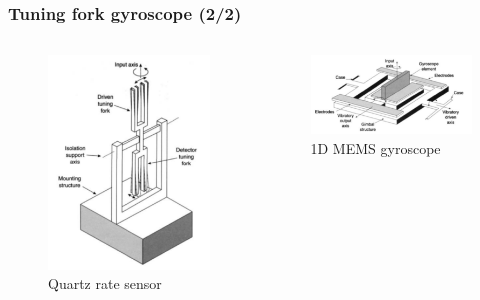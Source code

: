 \documentclass[10pt]{beamer}
\begin{document}
\begin{frame}
\frametitle{Tuning fork gyroscope (2/2)}
\begin{columns}
    \begin{column}{.45\textwidth}
        \begin{figure}
            \centering
            \includegraphics[width=0.9\linewidth]{quartz_rate_gyro.png}
            \caption{Quartz rate sensor\cite{Titterton}}
        \end{figure}
    \end{column}
    \hfill
    \begin{column}{.70\textwidth}
        \begin{figure}
            \centering
            \includegraphics[width=1.0\linewidth]{silicon_gyro.png}
            \caption{1D MEMS gyroscope\cite{Titterton}}
        \end{figure}
    \end{column}
\end{columns}
\end{frame}
\end{document}

